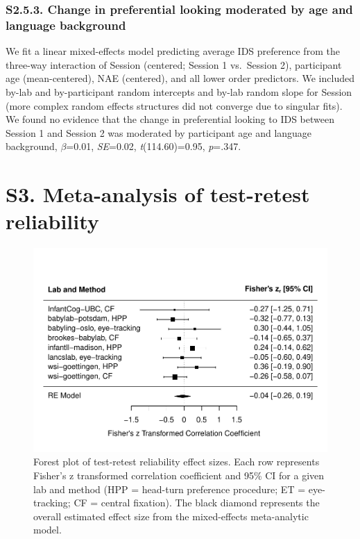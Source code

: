 \documentclass[
  man, donotrepeattitle,floatsintext]{apa6}
\begin{document}
\hypertarget{s2.5.3.-change-in-preferential-looking-moderated-by-age-and-language-background}{%
\subsubsection{S2.5.3. Change in preferential looking moderated by age and language background}\label{s2.5.3.-change-in-preferential-looking-moderated-by-age-and-language-background}}

We fit a linear mixed-effects model predicting average IDS preference from the three-way interaction of Session (centered; Session 1 vs.~Session 2), participant age (mean-centered), NAE (centered), and all lower order predictors.
We included by-lab and by-participant random intercepts and by-lab random slope for Session (more complex random effects structures did not converge due to singular fits).
We found no evidence that the change in preferential looking to IDS between Session 1 and Session 2 was moderated by participant age and language background, \(\beta\)=0.01, \emph{SE}=0.02, \emph{t}(114.60)=0.95, \emph{p}=.347.

\hypertarget{s3.-meta-analysis-of-test-retest-reliability}{%
\section{S3. Meta-analysis of test-retest reliability}\label{s3.-meta-analysis-of-test-retest-reliability}}

\begin{figure}
\centering
\includegraphics{MB1T_supplement_files/figure-latex/unnamed-chunk-18-1.pdf}
\caption{\label{fig:unnamed-chunk-18}Forest plot of test-retest reliability effect sizes. Each row represents Fisher's z transformed correlation coefficient and 95\% CI for a given lab and method (HPP = head-turn preference procedure; ET = eye-tracking; CF = central fixation). The black diamond represents the overall estimated effect size from the mixed-effects meta-analytic model.}
\end{figure}
\end{document}
